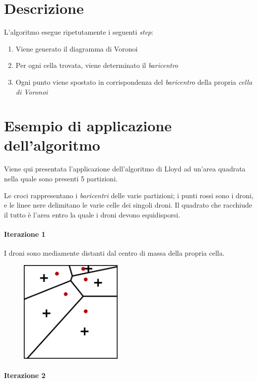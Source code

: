 \documentclass[11pt,a4paper]{report}
\begin{document}
\section{Descrizione}

L'algoritmo esegue ripetutamente i seguenti \textit{step}:

\begin{enumerate}
	\item Viene generato il diagramma di Voronoi
	\item Per ogni cella trovata, viene determinato il \textit{baricentro}
	\item Ogni punto viene spostato in corrispondenza del \textit{baricentro} della propria \textit{cella di Voronoi}
\end{enumerate}

\section{Esempio di applicazione dell'algoritmo}

Viene qui presentata l'applicazione dell'algoritmo di Lloyd ad un'area quadrata nella quale sono presenti 5 partizioni.

Le croci rappresentano i \textit{baricentri} delle varie partizioni; i punti rossi sono i droni, e le linee nere delimitano le varie celle dei singoli droni. Il quadrato che racchiude il tutto è l'area entro la quale i droni devono equidisporsi.

\paragraph{Iterazione 1}

I droni sono mediamente distanti dal centro di massa della propria cella.

\begin{figure}[H]
\includegraphics[width=5cm]{lloyd_iterazione_1.png}
\centering
\end{figure}

\paragraph{Iterazione 2}
\end{document}
